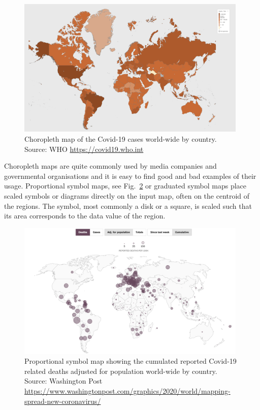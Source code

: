 \documentclass[article]{jdssv}\usepackage[]{graphicx}\usepackage[]{color}
\begin{document}
\begin{figure}
	\includegraphics[width = 0.98\textwidth]{Figures_Web/who_totalcases_choro.png}
	\caption{Choropleth map of the Covid-19 cases world-wide by country. Source: WHO \url{https://covid19.who.int}}
	\label{fig:choro1}
\end{figure}

Choropleth maps are quite commonly used by media companies and governmental organisations and it is easy to find good and bad examples of their usage. Proportional symbol maps, see Fig.~\ref{fig:propsymb} or graduated symbol maps place scaled symbols or diagrams directly on the input map, often on the centroid of the regions. The symbol, most commonly a disk or a square, is scaled such that its area corresponds to the data value of the region.


\begin{figure}
	\includegraphics[width = 0.98\textwidth]{Figures_Web/wp_totaldeaths_propsymb.png}
	\caption{Proportional symbol map showing the cumulated reported Covid-19 related deaths adjusted for population world-wide by country. Source: Washington Post \url{https://www.washingtonpost.com/graphics/2020/world/mapping-spread-new-coronavirus/}}
	\label{fig:propsymb}
\end{figure}
\end{document}
